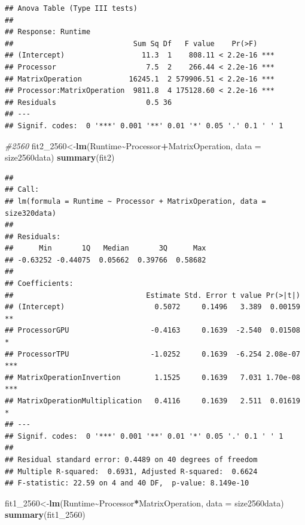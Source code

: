 \documentclass[
]{article}
\newenvironment{Shaded}{\begin{snugshade}}{\end{snugshade}}
\newcommand{\CommentTok}[1]{\textcolor[rgb]{0.56,0.35,0.01}{\textit{#1}}}
\newcommand{\DataTypeTok}[1]{\textcolor[rgb]{0.13,0.29,0.53}{#1}}
\newcommand{\DecValTok}[1]{\textcolor[rgb]{0.00,0.00,0.81}{#1}}
\newcommand{\KeywordTok}[1]{\textcolor[rgb]{0.13,0.29,0.53}{\textbf{#1}}}
\newcommand{\NormalTok}[1]{#1}
\newcommand{\OperatorTok}[1]{\textcolor[rgb]{0.81,0.36,0.00}{\textbf{#1}}}
\begin{document}
\begin{verbatim}
## Anova Table (Type III tests)
## 
## Response: Runtime
##                            Sum Sq Df   F value    Pr(>F)    
## (Intercept)                  11.3  1    808.11 < 2.2e-16 ***
## Processor                     7.5  2    266.44 < 2.2e-16 ***
## MatrixOperation           16245.1  2 579906.51 < 2.2e-16 ***
## Processor:MatrixOperation  9811.8  4 175128.60 < 2.2e-16 ***
## Residuals                     0.5 36                        
## ---
## Signif. codes:  0 '***' 0.001 '**' 0.01 '*' 0.05 '.' 0.1 ' ' 1
\end{verbatim}

\begin{Shaded}
\begin{Highlighting}[]
\CommentTok{\#2560}
\NormalTok{fit2\_}\DecValTok{2560}\NormalTok{\textless{}{-}}\KeywordTok{lm}\NormalTok{(Runtime}\OperatorTok{\textasciitilde{}}\NormalTok{Processor}\OperatorTok{+}\NormalTok{MatrixOperation, }\DataTypeTok{data =}\NormalTok{ size2560data)}
\KeywordTok{summary}\NormalTok{(fit2)}
\end{Highlighting}
\end{Shaded}

\begin{verbatim}
## 
## Call:
## lm(formula = Runtime ~ Processor + MatrixOperation, data = size320data)
## 
## Residuals:
##      Min       1Q   Median       3Q      Max 
## -0.63252 -0.44075  0.05662  0.39766  0.58682 
## 
## Coefficients:
##                               Estimate Std. Error t value Pr(>|t|)    
## (Intercept)                     0.5072     0.1496   3.389  0.00159 ** 
## ProcessorGPU                   -0.4163     0.1639  -2.540  0.01508 *  
## ProcessorTPU                   -1.0252     0.1639  -6.254 2.08e-07 ***
## MatrixOperationInvertion        1.1525     0.1639   7.031 1.70e-08 ***
## MatrixOperationMultiplication   0.4116     0.1639   2.511  0.01619 *  
## ---
## Signif. codes:  0 '***' 0.001 '**' 0.01 '*' 0.05 '.' 0.1 ' ' 1
## 
## Residual standard error: 0.4489 on 40 degrees of freedom
## Multiple R-squared:  0.6931, Adjusted R-squared:  0.6624 
## F-statistic: 22.59 on 4 and 40 DF,  p-value: 8.149e-10
\end{verbatim}

\begin{Shaded}
\begin{Highlighting}[]
\NormalTok{fit1\_}\DecValTok{2560}\NormalTok{\textless{}{-}}\KeywordTok{lm}\NormalTok{(Runtime}\OperatorTok{\textasciitilde{}}\NormalTok{Processor}\OperatorTok{*}\NormalTok{MatrixOperation, }\DataTypeTok{data =}\NormalTok{ size2560data)}
\KeywordTok{summary}\NormalTok{(fit1\_}\DecValTok{2560}\NormalTok{)}
\end{Highlighting}
\end{Shaded}
\end{document}
